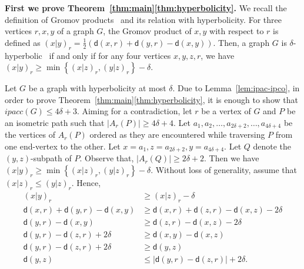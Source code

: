 \documentclass[a4paper]{article}
\newcommand{\dist}[2]{\mathsf{d}\left(#1,#2\right)}
\newcommand{\anticp}[2]{A_{#1}\left(#2\right)}
\newcommand{\ipac}[1]{ipacc\left(#1\right)}
\begin{document}
\newcommand{\Gromov}[3]{\left(#1|#2\right)_{#3}}
\textbf{First we prove Theorem~\ref{thm:main}\ref{thm:hyperbolicity}.} We recall the definition of Gromov products~\cite{gromov1987} and its relation with hyperbolicity. For three vertices $r,x,y$ of a graph $G$, the Gromov product of $x,y$ with respect to $r$ is defined as $\Gromov{x}{y}{r} = \frac{1}{2}\left(\dist{x}{r} + \dist{y}{r} - \dist{x}{y}\right)$.
%
Then, a graph $G$ is $\delta$-hyperbolic~\cite{chepoi2019fast,gromov1987} if and only if for any four vertices $x,y,z,r$, we have $\Gromov{x}{y}{r} \geq \min\left\{ \Gromov{x}{z}{r}, \Gromov{y}{z}{r} \right\} - \delta$.


Let $G$ be a graph with hyperbolicity at most $\delta$. Due to
Lemma~\ref{lem:ipac-ipco}, in order to prove
Theorem~\ref{thm:main}\ref{thm:hyperbolicity}, it is enough to show
that $\ipac{G} \leq 4\delta+3$.
Aiming {for a} contradiction, let $r$ be a vertex of $G$ and $P$ be an
isometric path such that $|\anticp{r}{P}|\geq 4\delta+4$. Let
$a_1, a_2, \ldots, a_{2\delta+2}, \ldots, a_{4\delta+4}$ be the
vertices of $\anticp{r}{P}$ ordered as they are encountered while
traversing $P$ from one end-vertex to the other. Let
$x=a_1, z=a_{2\delta+2}, y=a_{4\delta+4}.$ Let $Q$ denote the
$(y,z)$-subpath of $P$. Observe that,
$|\anticp{r}{Q}| \geq 2\delta+2$.  Then we have 
$ \Gromov{x}{y}{r} \geq \min\left\{ \Gromov{x}{z}{r}, \Gromov{y}{z}{r}
\right\} - \delta$. Without loss of generality, assume that
$\Gromov{x}{z}{r} \leq \Gromov{y}{z}{r}$. Hence,
\begin{align*}
  \Gromov{x}{y}{r} & \geq \Gromov{x}{z}{r} - \delta \\
  \dist{x}{r} + \dist{y}{r} - \dist{x}{y} & \geq \dist{x}{r} + \dist{z}{r} - \dist{x}{z} - 2\delta\\
  \dist{y}{r} - \dist{x}{y} & \geq \dist{z}{r} - \dist{x}{z} - 2\delta\\
  \dist{y}{r} - \dist{z}{r} + 2\delta & \geq \dist{x}{y} - \dist{x}{z}\\
  \dist{y}{r} - \dist{z}{r} + 2\delta & \geq \dist{y}{z}\\
  \dist{y}{z} & \leq \left|\dist{y}{r} - \dist{z}{r}\right| + 2 \delta.
\end{align*}
 
\end{document}
